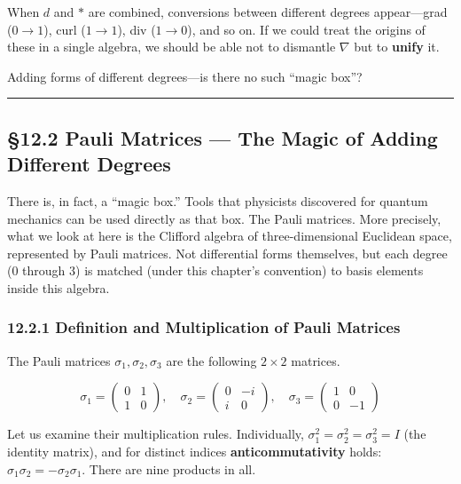 When \(d\) and \(\ast\) are combined, conversions between different
degrees appear---grad (\(0\to1\)), curl (\(1\to1\)), div (\(1\to0\)),
and so on. If we could treat the origins of these in a single algebra,
we should be able not to dismantle \(\nabla\) but to \textbf{unify} it.

Adding forms of different degrees---is there no such ``magic box''?

\begin{center}\rule{0.5\linewidth}{0.5pt}\end{center}

\hypertarget{pauli-matrices-the-magic-of-adding-different-degrees}{%
\subsection{§12.2 Pauli Matrices --- The Magic of Adding Different
Degrees}\label{pauli-matrices-the-magic-of-adding-different-degrees}}

There is, in fact, a ``magic box.'' Tools that physicists discovered for
quantum mechanics can be used directly as that box. The Pauli matrices.
More precisely, what we look at here is the Clifford algebra of
three-dimensional Euclidean space, represented by Pauli matrices. Not
differential forms themselves, but each degree (\(0\) through \(3\)) is
matched (under this chapter's convention) to basis elements inside this
algebra.

\hypertarget{definition-and-multiplication-of-pauli-matrices}{%
\subsubsection{12.2.1 Definition and Multiplication of Pauli
Matrices}\label{definition-and-multiplication-of-pauli-matrices}}

The Pauli matrices \(\sigma_1, \sigma_2, \sigma_3\) are the following
\(2\times2\) matrices.

\[
\sigma_1 = \begin{pmatrix}0 & 1 \\ 1 & 0\end{pmatrix},\quad
\sigma_2 = \begin{pmatrix}0 & -i \\ i & 0\end{pmatrix},\quad
\sigma_3 = \begin{pmatrix}1 & 0 \\ 0 & -1\end{pmatrix}
\]

Let us examine their multiplication rules. Individually,
\(\sigma_1^2 = \sigma_2^2 = \sigma_3^2 = I\) (the identity matrix), and
for distinct indices \textbf{anticommutativity} holds:
\(\sigma_1\sigma_2 = -\sigma_2\sigma_1\). There are nine products in
all.

